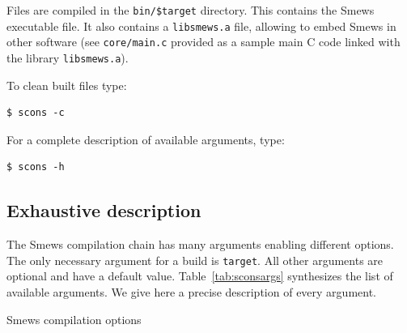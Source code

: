 \documentclass{report}
\newcommand{\rtab}[1]{Table~\ref{tab:#1}}
\begin{document}
Files are compiled in the \verb+bin/$target+ directory. This contains the Smews executable file. It also contains a \verb+libsmews.a+ file, allowing to embed Smews in other software (see \verb+core/main.c+ provided as a sample main C code linked with the library \verb+libsmews.a+).

To clean built files type:
\begin{verbatim}
$ scons -c
\end{verbatim}

For a complete description of available arguments, type:
\begin{verbatim}
$ scons -h
\end{verbatim}

\subsection{Exhaustive description}

The Smews compilation chain has many arguments enabling different options. The only necessary argument for a build is \verb+target+. All other arguments are optional and have a default value. \rtab{sconsargs} synthesizes the list of available arguments. We give here a precise description of every argument.

\begin{table}
\caption{Smews compilation options}
\label{tab:sconsargs}
\end{table}
\end{document}
